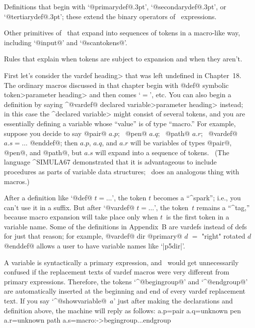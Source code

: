 \item\bull Definitions that begin with `@primarydef@\kern.3pt',
`@secondarydef@\kern.3pt', or `@tertiarydef@\kern.3pt'; these extend the
binary operators of \MF\ expressions.

\item\bull Other primitives of \MF\ that expand into sequences of tokens
in a macro-like way, including `@input@' and `@scantokens@'.

\item\bull Rules that explain when tokens are subject to expansion
and when they aren't.

\danger First let's consider the \<vardef heading> that was left
undefined in Chapter~18. The ordinary macros discussed in that chapter
begin with
\begindisplay
@def@ \<symbolic token>\<parameter heading>
\enddisplay
and then comes `$=$', etc. You can also begin a definition by saying
\begindisplay
^@vardef@ \<declared variable>\<parameter heading>
\enddisplay
instead; in this case the ^\<declared variable> might consist of
several tokens, and you are essentially defining a variable whose
``value'' is of type ``macro.'' For example, suppose you decide to say
\begindisplay
@pair@ $a.p$; \ @pen@ $a.q$; \ @path@ $a.r$; \
@vardef@ $a.s=\ldots$ @enddef@;
\enddisplay
then $a.p$, $a.q$, and $a.r$ will be variables of types @pair@, @pen@,
and @path@, but $a.s$ will expand into a sequence of tokens. \
(The language {\eightrm^{SIMULA67}} demonstrated that it is advantageous
to include procedures as parts of variable data structures; \MF\ does an
analogous thing with macros.)

\danger After a definition like `@def@ $t=\ldots$', the token $t$ becomes
a ``^{spark}''; i.e., you can't use it in a suffix. But after
`@vardef@ $t=\ldots$', the token~$t$ remains a ``^{tag},'' because
macro expansion will take place only when $t$~is the first token in
a variable name. Some of the definitions in Appendix~B are vardefs
instead of defs for just that reason; for example,
\begindisplay
@vardef@ dir @primary@ $d$ $=$ "right" rotated $d$ @enddef@
\enddisplay
allows a user to have variable names like `|p5dir|'.

\danger A variable is syntactically a primary expression, and \MF\ would
get unnecessarily confused if the replacement texts of vardef macros
were very different from primary expressions. Therefore, the
tokens `^@begingroup@'
and `^@endgroup@' are automatically inserted at the beginning and end
of every vardef replacement text. If you say `^@showvariable@~$a$'
just after making the declarations and definition above, the machine
will reply as follows:
\begintt
a.p=pair
a.q=unknown pen
a.r=unknown path
a.s=macro:->begingroup...endgroup
\endtt

